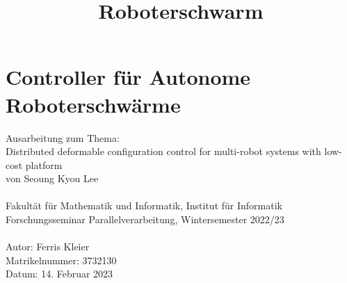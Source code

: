 \documentclass[12pt]{article}
\title{Roboterschwarm}
\begin{document}
     \section*{Controller für Autonome Roboterschwärme}
    Ausarbeitung zum Thema:\\Distributed deformable configuration control for multi-robot systems with 
    low-cost platform
    \\von Seoung Kyou Lee\\\\
    Fakultät für Mathematik und Informatik, Institut für Informatik\\
    Forschungsseminar Parallelverarbeitung, Wintersemester 2022/23\\\\
    Autor: Ferris Kleier\\
    Matrikelnummer: 3732130\\
    Datum: 14. Februar 2023

    

    

    

    

    
    
    

    
    
    
    
    

    
\end{document}

